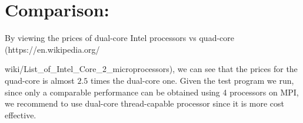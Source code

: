 \documentclass[12pt] {article}
\begin{document}
\section{Comparison:}

By viewing the prices of dual-core Intel processors vs quad-core (https://en.wikipedia.org/

 wiki/List\_of\_Intel\_Core\_2\_microprocessors), we can see that the prices for the quad-core is almost $2.5$ times the dual-core one. Given the test program we run, since only a comparable performance can be obtained using 4 processors on MPI, we recommend to use dual-core thread-capable processor since it is more cost effective. 
\end{document}
